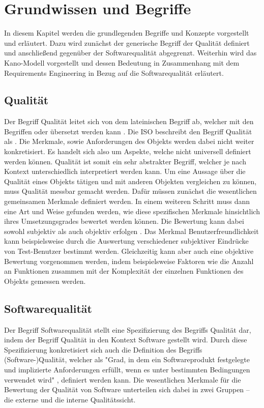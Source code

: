 \section{Grundwissen und Begriffe}
In diesem Kapitel werden die grundlegenden Begriffe und Konzepte vorgestellt und erläutert.
Dazu wird zunächst der generische Begriff der Qualität definiert und anschließend gegenüber der Softwarequalität abgegrenzt.
Weiterhin wird das Kano-Modell vorgestellt und dessen Bedeutung in Zusammenhang mit dem Requirements Engineering in Bezug auf die Softwarequalität erläutert.
\subsection{Qualität}
Der Begriff Qualität leitet sich von dem lateinischen Begriff  ab, welcher mit den Begriffen  oder  übersetzt werden kann \autocite[vgl.][]{noauthor_was_nodate}.
Die \ac{ISO} beschreibt den Begriff Qualität als  \autocite[S. 17]{iso_iso_2015}.
Die Merkmale, sowie Anforderungen des Objekts werden dabei nicht weiter konkretisiert.
Es handelt sich also um Aspekte, welche nicht universell definiert werden können.
Qualität ist somit ein sehr abstrakter Begriff, welcher je nach Kontext unterschiedlich interpretiert werden kann.
\newparagraph
Um eine Aussage über die Qualität eines Objekts tätigen und mit anderen Objekten vergleichen zu können, muss Qualität messbar gemacht werden.
Dafür müssen zunächst die wesentlichen gemeinsamen Merkmale definiert werden.
In einem weiteren Schritt muss dann eine Art und Weise gefunden werden, wie diese spezifischen Merkmale hinsichtlich ihres Umsetzungsgrades bewertet werden können.
Die Bewertung kann dabei sowohl subjektiv als auch objektiv erfolgen \autocite[vgl.][S. 53]{shewhart_economic_1931}.
Das Merkmal Benutzerfreundlichkeit kann beispielsweise durch die Auswertung verschiedener subjektiver Eindrücke von Test-Benutzer bestimmt werden.
Gleichzeitig kann aber auch eine objektive Bewertung vorgenommen werden, indem beispielsweise Faktoren wie die Anzahl an Funktionen zusammen mit der Komplexität der einzelnen Funktionen des Objekts gemessen werden.

\subsection{Softwarequalität}\label{sec:SoftwareQualitaet}
Der Begriff Softwarequalität stellt eine Spezifizierung des Begriffs Qualität dar, indem der Begriff Qualität in den Kontext Software gestellt wird.
Durch diese Spezifizierung konkretisiert sich auch die Definition des Begriffs (Software-)Qualität, welcher als "Grad, in dem ein Softwareprodukt festgelegte und implizierte Anforderungen erfüllt, wenn es unter bestimmten Bedingungen verwendet wird" \autocite[S. 17]{iso_iso_2011}, definiert werden kann.
Die wesentlichen Merkmale für die Bewertung der Qualität von Software unterteilen sich dabei in zwei Gruppen -- die externe und die interne Qualitätssicht.

